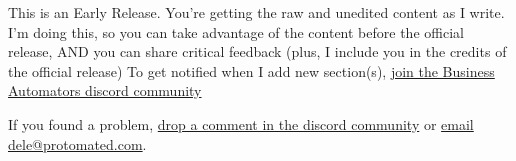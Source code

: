 \begin{warningblock}
    This is an Early Release. You're getting the raw and unedited content as I write. I'm doing this, so you can take advantage of the content
    before the official release, AND you can share critical feedback (plus, I include you in the credits of the official release)
    To get notified when I add new section(s), \href{https://discord.gg/X2USgYTB}{join the Business Automators discord community}
\end{warningblock}
\begin{importantblock}
    If you found a problem, \href{https://discord.gg/X2USgYTB}{drop a comment in the discord community} or  \href{mailto:dele@protomated.com}{email dele@protomated.com}.
\end{importantblock}


%
%